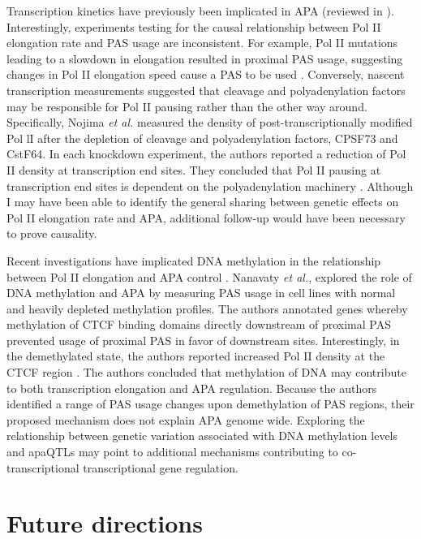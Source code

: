 Transcription kinetics have previously been implicated in APA (reviewed in \citep{proudfoot_transcriptional_2016}). Interestingly, experiments testing for the causal relationship between Pol II elongation rate and PAS usage are inconsistent. For example, Pol II mutations leading to a slowdown in elongation resulted in proximal PAS usage, suggesting changes in Pol II elongation speed cause a PAS to be used \citep{pinto_rna_2011, kornblihtt_chromatin_2006, de_la_mata_slow_2003, howe_perturbation_2003}. Conversely, nascent transcription measurements suggested that cleavage and polyadenylation factors may be responsible for Pol II pausing rather than the other way around. Specifically, Nojima \emph{et al.} measured the density of post-transcriptionally modified Pol lI after the depletion of cleavage and polyadenylation factors, CPSF73 and CstF64. In each knockdown experiment, the authors reported a reduction of Pol II density at transcription end sites. They concluded that Pol II pausing at transcription end sites is dependent on the polyadenylation machinery \citep{nojima_mammalian_2015}. Although I may have been able to identify the general sharing between genetic effects on Pol II elongation rate and APA, additional follow-up would have been necessary to prove causality. 

Recent investigations have implicated DNA methylation in the relationship between Pol II elongation and APA control \citep{nanavaty_dna_2020}. Nanavaty \emph{et al.}, explored the role of DNA methylation and APA by measuring PAS usage in cell lines with normal and heavily depleted methylation profiles. The authors annotated genes whereby methylation of CTCF binding domains directly downstream of proximal PAS prevented usage of proximal PAS in favor of downstream sites. Interestingly, in the demethylated state, the authors reported increased Pol II density at the CTCF region \citep{nanavaty_dna_2020}. The authors concluded that methylation of DNA may contribute to both transcription elongation and APA regulation. Because the authors identified a range of PAS usage changes upon demethylation of PAS regions, their proposed mechanism does not explain APA genome wide. Exploring the relationship between genetic variation associated with DNA methylation levels and apaQTLs may point to additional mechanisms contributing to co-transcriptional transcriptional gene regulation. 

\section{Future directions}

